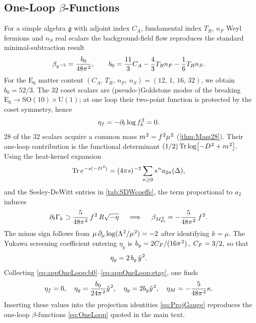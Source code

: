\documentclass[pdflatex,sn-mathphys-num]{sn-jnl}
\theoremstyle{thmstyleone}
\theoremstyle{thmstyletwo}%
\theoremstyle{thmstylethree}%
\newcommand{\SO}[1]{\mathrm{SO(#1)}}
\newcommand{\U}[1]{\mathrm{U(#1)}}
\newcommand{\E}[1]{\mathrm{E_{#1}}}
\newcommand{\SOTen}{\SO{10}}
\newcommand{\UOne}{\U{1}}
\newcommand{\ESix}{\E{6}}
\newcommand{\SOTenXUOne}{\SOTen \times \UOne}
\newcommand{\Tr}{\operatorname{Tr}}
\newcommand{\sm}{\hspace{.065em}}
\newcommand{\smexp}[1]{^{\sm #1}}
\begin{document}
\begin{appendices}
\subsection{One-Loop \texorpdfstring{$\beta$}{Beta}-Functions}
\label{app:FRG:OneLoop}

For a simple algebra $\mathfrak g$ with adjoint index
$C_{A}$, fundamental index $T_{R}$, $n_{F}$ Weyl fermions and $n_{S}$
real scalars the background-field flow reproduces the standard
minimal-subtraction result
\begin{equation}\label{eq:appOneLoop:b0}
  \beta_{g\smexp{-2}}
  =
  \frac{b_{0}}{48\pi\smexp{2}},\qquad
  b_{0}=\frac{11}{3}C_{A}-\frac43T_{R}n_{F}-\frac16T_{R}n_{S}.
\end{equation}
For the $\ESix$ matter content
\((C_{A},\,T_{R},\,n_{F},\,n_{S})=(12,\,1,\,16,\,32)\), we obtain
$b_{0}=52/3$. The $32$ coset scalars are (pseudo-)Goldstone modes of the breaking
$\ESix\to\SOTenXUOne$; at one loop their two-point function is
protected by the coset symmetry, hence
\begin{equation}\label{eq:appOneLoop:etaf}
  \eta_{f}=-\partial_{t}\log f\smexp{2}_{k}=0.
\end{equation}
$28$ of the $32$ scalars acquire a common mass
\(m\smexp{2}=f\smexp{2}\mu\smexp{2}\) (\autoref{thm:Mass28}). Their one-loop contribution is the functional determinant
\(
  (1/2)\Tr\log\bigl[-D\smexp{2}+m\smexp{2}\bigr].
\)
Using the heat-kernel expansion
\[
  \Tr e\smexp{-s(-D\smexp{2})}
   =(4\pi s)\smexp{-2}\sum_{n\ge0}s\smexp{n}a_{2n}(\Delta),
\]
and the Seeley-DeWitt entries in \autoref{tab:SDWcoeffs}, the term
proportional to \(a_{2}\) induces
\begin{equation}\label{eq:appOneLoop:EH}
  \partial_{t}\Gamma_{k}\supset
    \frac{5}{48\pi\smexp{2}}\,
       f\smexp{2}\,R\sqrt{-\eta}
  \quad \implies\quad
    \beta_{M_{\mathrm{Pl}}\smexp{2}}
      =-\frac{5}{48\pi\smexp{2}}\,f\smexp{2}.
\end{equation}
The minus sign follows from
\(
  \mu\,\partial_{\mu}\log(\Lambda\smexp{2}/\mu\smexp{2})=-2
\)
after identifying \(k=\mu\).
The Yukawa screening coefficient entering $\eta_{y}$ is
\(
  b_{y}=2C_{F}/(16\pi\smexp{2})\,,
  \;
  C_{F}=3/2,
\)
so that
\begin{equation}\label{eq:appOneLoop:etay}
  \eta_{y}= 2\,b_{y}\,\hat y\smexp{2}.
\end{equation}
Collecting \eqref{eq:appOneLoop:b0}--\eqref{eq:appOneLoop:etay}, one finds
\[
  \eta_{f}=0,\quad
  \eta_{g}= \frac{b_{0}}{24\pi\smexp{2}}\hat g\smexp{2},\quad
  \eta_{y}= 2b_{y}\hat y\smexp{2},\quad
  \eta_{M}= -\frac{5}{48\pi\smexp{2}}\kappa.
\]
Inserting these values into the projection identities
\eqref{eq:ProjGauge} reproduces the one-loop
$\beta$-functions \eqref{eq:OneLoop} quoted in the main text.



\end{appendices}
\end{document}
